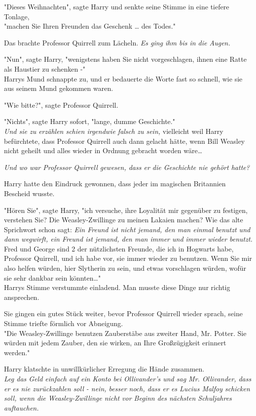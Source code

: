 {"Dieses Weihnachten", sagte Harry und senkte seine Stimme in eine tiefere Tonlage,\\ "machen Sie Ihren Freunden das Geschenk … des Todes."

Das brachte Professor Quirrell zum Lächeln. \emph{Es ging ihm bis in die Augen.}

"Nun", sagte Harry, "wenigstens haben Sie nicht vorgeschlagen, ihnen eine Ratte als Haustier zu schenken -"\\ Harrys Mund schnappte zu, und er bedauerte die Worte fast so schnell, wie sie aus seinem Mund gekommen waren.

"Wie bitte?", sagte Professor Quirrell.

"Nichts", sagte Harry sofort, "lange, dumme Geschichte."\\ \emph{Und sie zu erzählen schien irgendwie falsch zu sein,} vielleicht weil Harry befürchtete, dass Professor Quirrell auch dann gelacht hätte, wenn Bill Weasley nicht geheilt und alles wieder in Ordnung gebracht worden wäre…

\emph{Und wo war Professor Quirrell gewesen, dass er die Geschichte nie gehört hatte?}

Harry hatte den Eindruck gewonnen, dass jeder im magischen Britannien Bescheid wusste.

"Hören Sie", sagte Harry, "ich versuche, ihre Loyalität mir gegenüber zu festigen, verstehen Sie? Die Weasley-Zwillinge zu meinen Lakaien machen? Wie das alte Sprichwort schon sagt: \emph{Ein Freund ist nicht jemand, den man einmal benutzt und dann wegwirft, ein Freund ist jemand, den man immer und immer wieder benutzt.}\\ Fred und George sind 2 der nützlichsten Freunde, die ich in Hogwarts habe, Professor Quirrell, und ich habe vor, sie immer wieder zu benutzen. Wenn Sie mir also helfen würden, hier Slytherin zu sein, und etwas vorschlagen würden, wofür sie sehr dankbar sein könnten…"\\ Harrys Stimme verstummte einladend. Man musste diese Dinge nur richtig ansprechen.

Sie gingen ein gutes Stück weiter, bevor Professor Quirrell wieder sprach, seine Stimme triefte förmlich vor Abneigung.\\ "Die Weasley-Zwillinge benutzen Zauberstäbe aus zweiter Hand, Mr. Potter. Sie würden mit jedem Zauber, den sie wirken, an Ihre Großzügigkeit erinnert werden."

Harry klatschte in unwillkürlicher Erregung die Hände zusammen.\\ \emph{Leg das Geld einfach auf ein Konto bei Ollivander's und sag Mr. Ollivander, dass er es nie zurückzahlen soll - nein, besser noch, dass er es Lucius Malfoy schicken soll, wenn die Weasley-Zwillinge nicht vor Beginn des nächsten Schuljahres auftauchen.}

}
